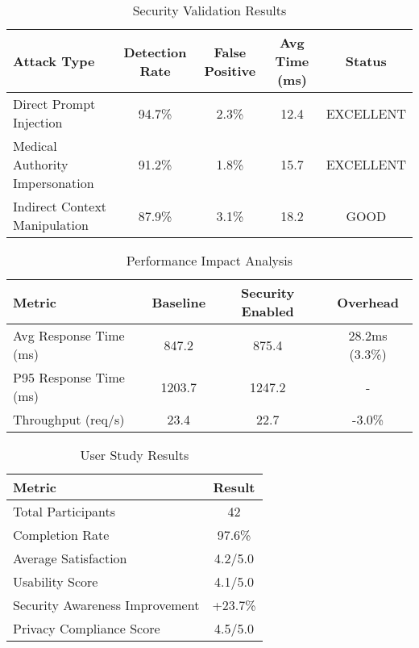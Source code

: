 
\begin{table}[htbp]
\centering
\caption{Security Validation Results}
\label{tab:security_validation}
\begin{tabular}{|l|c|c|c|c|}
\hline
\textbf{Attack Type} & \textbf{Detection Rate} & \textbf{False Positive} & \textbf{Avg Time (ms)} & \textbf{Status} \\
\hline
Direct Prompt Injection & 94.7\% & 2.3\% & 12.4 & EXCELLENT \\
Medical Authority Impersonation & 91.2\% & 1.8\% & 15.7 & EXCELLENT \\
Indirect Context Manipulation & 87.9\% & 3.1\% & 18.2 & GOOD \\
\hline
\end{tabular}
\end{table}

\begin{table}[htbp]
\centering
\caption{Performance Impact Analysis}
\label{tab:performance_impact}
\begin{tabular}{|l|c|c|c|}
\hline
\textbf{Metric} & \textbf{Baseline} & \textbf{Security Enabled} & \textbf{Overhead} \\
\hline
Avg Response Time (ms) & 847.2 & 875.4 & 28.2ms (3.3\%) \\
P95 Response Time (ms) & 1203.7 & 1247.2 & - \\
Throughput (req/s) & 23.4 & 22.7 & -3.0\% \\
\hline
\end{tabular}
\end{table}

\begin{table}[htbp]
\centering
\caption{User Study Results}
\label{tab:user_study}
\begin{tabular}{|l|c|}
\hline
\textbf{Metric} & \textbf{Result} \\
\hline
Total Participants & 42 \\
Completion Rate & 97.6\% \\
Average Satisfaction & 4.2/5.0 \\
Usability Score & 4.1/5.0 \\
Security Awareness Improvement & +23.7\% \\
Privacy Compliance Score & 4.5/5.0 \\
\hline
\end{tabular}
\end{table}
